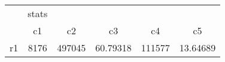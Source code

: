 \begin{tabular}{l*{5}{c}}
\hline\hline
            &       stats&            &            &            &            \\
            &          c1&          c2&          c3&          c4&          c5\\
\hline
r1          &        8176&      497045&    60.79318&      111577&    13.64689\\
\hline\hline
\end{tabular}
